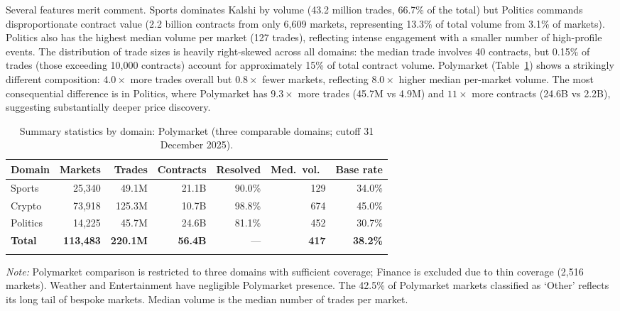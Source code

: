\documentclass[numsec,webpdf,modern,medium]{oup-authoring-template}
\theoremstyle{thmstyleone}%
\theoremstyle{thmstyletwo}%
\theoremstyle{thmstylethree}%
\begin{document}
Several features merit comment. Sports dominates Kalshi by volume (43.2 million trades, 66.7\% of the total) but Politics commands disproportionate contract value (2.2 billion contracts from only 6,609 markets, representing 13.3\% of total volume from 3.1\% of markets). Politics also has the highest median volume per market (127 trades), reflecting intense engagement with a smaller number of high-profile events. The distribution of trade sizes is heavily right-skewed across all domains: the median trade involves 40 contracts, but 0.15\% of trades (those exceeding 10,000 contracts) account for approximately 15\% of total contract volume. Polymarket (Table~\ref{tab:poly_summary}) shows a strikingly different composition: $4.0\times$ more trades overall but $0.8\times$ fewer markets, reflecting $8.0\times$ higher median per-market volume. The most consequential difference is in Politics, where Polymarket has $9.3\times$ more trades (45.7M vs 4.9M) and $11\times$ more contracts (24.6B vs 2.2B), suggesting substantially deeper price discovery.

\begin{table}[!t]
\caption{Summary statistics by domain: Polymarket (three comparable domains; cutoff 31 December 2025).\label{tab:poly_summary}}%
\begin{tabular*}{\columnwidth}{@{\extracolsep\fill}lrrrrrr@{\extracolsep\fill}}
\toprule
Domain & Markets & Trades & Contracts & Resolved & Med.\ vol.\ & Base rate \\
\midrule
Sports   & 25,340  & 49.1M  & 21.1B  & 90.0\% & 129 & 34.0\% \\
Crypto   & 73,918  & 125.3M & 10.7B  & 98.8\% & 674 & 45.0\% \\
Politics & 14,225  & 45.7M  & 24.6B  & 81.1\% & 452 & 30.7\% \\
\midrule
\textbf{Total} & \textbf{113,483} & \textbf{220.1M} & \textbf{56.4B} & --- & \textbf{417} & \textbf{38.2\%} \\
\botrule
\end{tabular*}
\begin{tablenotes}%
\item \emph{Note:} Polymarket comparison is restricted to three domains with sufficient coverage; Finance is excluded due to thin coverage (2,516 markets). Weather and Entertainment have negligible Polymarket presence. The 42.5\% of Polymarket markets classified as `Other' reflects its long tail of bespoke markets. Median volume is the median number of trades per market.
\end{tablenotes}
\end{table}
\end{document}
